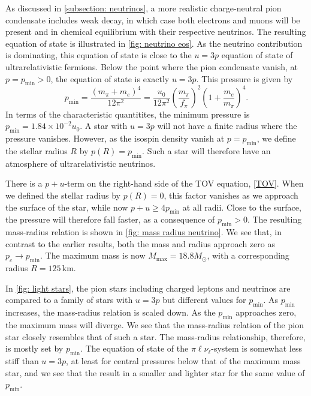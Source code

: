 As discussed in \autoref{subsection: neutrinos}, a more realistic charge-neutral pion condensate includes weak decay, in which case both electrons and muons will be present and in chemical equilibrium with their respective neutrinos.
The resulting equation of state is illustrated in \autoref{fig: neutrino eos}.
As the neutrino contribution is dominating, this equation of state is close to the $u = 3p$ equation of state of ultrarelativistic fermions.
Below the point where the pion condensate vanish, at $p = p_\text{min}>0$, the equation of state is exactly $u = 3p$.
This pressure is given by
%
\begin{equation}
    p_\text{min} 
    = \frac{(m_\pi + m_e)^4}{12\pi^2}
    = \frac{u_0}{12\pi^2} \left(\frac{m_\pi}{f_\pi}\right)^2 \left(1 + \frac{m_e}{m_\pi}\right)^4.
\end{equation}
%
In terms of the characteristic quantitites, the minimum pressure is $p_\text{min} = 1.84 \times 10^{-2} u_0$.
A star with $u = 3p$ will not have a finite radius where the pressure vanishes.
However, as the isospin density vanish at $p = p_\text{min}$, we define the stellar radius $R$ by $p(R) = p_\text{min}$.
Such a star will therefore have an atmosphere of ultrarelativistic neutrinos.

There is a $p+u$-term on the right-hand side of the TOV equation, \autoref{TOV}.
When we defined the stellar radius by $p(R) = 0$, this factor vanishes as we approach the surface of the star, while now $p+u \geq 4 p_\text{min}$ at all radii.
Close to the surface, the pressure will therefore fall faster, as a consequence of $p_\text{min}>0$.
The resulting mass-radius relation is shown in \autoref{fig: mass radius neutrino}.
We see that, in contrast to the earlier results, both the mass and radius approach zero as $p_c \rightarrow p_\text{min}$.
The maximum mass is now $M_\text{max} = 18.8 M_\odot$, with a corresponding radius $R = 125 \, \text{km}$.

In \autoref{fig: light stars}, the pion stars including charged leptons and neutrinos are compared to a family of stars with $u = 3p$ but different values for $p_\text{min}$.
As $p_\text{min}$ increases, the mass-radius relation is scaled down.
As the $p_\text{min}$ approaches zero, the maximum mass will diverge.
We see that the mass-radius relation of the pion star closely resembles that of such a star.
The mass-radius relationship, therefore, is mostly set by $p_\text{min}$.
The equation of state of the $\pi\ell\nu_\ell$-system is somewhat less stiff than $u = 3p$, at least for central pressures below that of the maximum mass star, and we see that the result in a smaller and lighter star for the same value of $p_\text{min}$.

